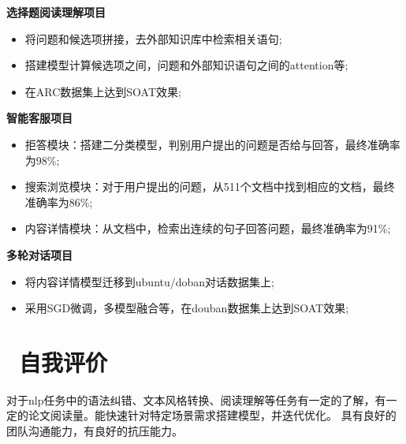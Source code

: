 \documentclass{resume}
\begin{document}
\vspace{0.1cm}

\textbf{选择题阅读理解项目}
\begin{itemize}
  \item 将问题和候选项拼接，去外部知识库中检索相关语句;
  \item 搭建模型计算候选项之间，问题和外部知识语句之间的attention等;
  \item 在ARC数据集上达到SOAT效果;
\end{itemize}
\vspace{0.1cm}

\textbf{智能客服项目}
\begin{itemize}
  \item 拒答模块：搭建二分类模型，判别用户提出的问题是否给与回答，最终准确率为98\%;
  \item 搜索浏览模块：对于用户提出的问题，从511个文档中找到相应的文档，最终准确率为86\%;
  \item 内容详情模块：从文档中，检索出连续的句子回答问题，最终准确率为91\%;
\end{itemize}
\vspace{0.1cm}

\textbf{多轮对话项目}
\begin{itemize}
  \item 将内容详情模型迁移到ubuntu/doban对话数据集上;
  \item 采用SGD微调，多模型融合等，在douban数据集上达到SOAT效果;
\end{itemize}




\section{\faCogs\ 自我评价}
对于nlp任务中的语法纠错、文本风格转换、阅读理解等任务有一定的了解，有一定的论文阅读量。能快速针对特定场景需求搭建模型，并迭代优化。
具有良好的团队沟通能力，有良好的抗压能力。
%
%
\end{document}
